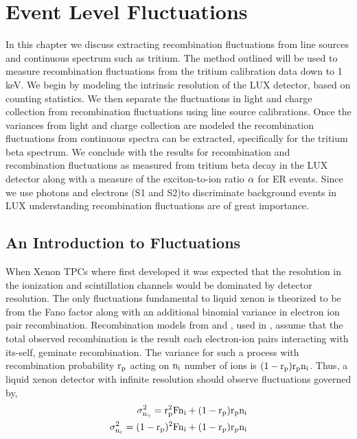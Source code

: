 \renewcommand{\thechapter}{5}

\chapter{Event Level Fluctuations}
\label{Ch:Flucs}

In this chapter we discuss extracting recombination fluctuations from line sources and continuous spectrum such as tritium. The method outlined will be used to measure recombination fluctuations from the tritium calibration data down to 1 keV. We begin by modeling the intrinsic resolution of the LUX detector, based on counting statistics. We then separate the fluctuations in light and charge collection from recombination fluctuations using line source calibrations. Once the variances from light and charge collection are modeled the recombination fluctuations from continuous spectra can be extracted, specifically for the tritium beta spectrum. We conclude with the results for recombination and recombination fluctuations as measured from tritium beta decay in the LUX detector along with a measure of the exciton-to-ion ratio $\rm \alpha$ for ER events. Since we use photons and electrons (S1 and S2)to discriminate background events in LUX understanding recombination fluctuations are of great importance.

\section{An Introduction to Fluctuations}

When Xenon TPCs where first developed it was expected that the resolution in the ionization and scintillation channels would be dominated by detector resolution. The only fluctuations fundamental to liquid xenon is theorized to be from the Fano factor along with an additional binomial variance in electron ion pair recombination. Recombination models from \cite{Thomas_Imel} and \cite{Birks}, used in \cite{NEST_2013}, assume that the total observed recombination is the result each electron-ion pairs interacting with its-self, geminate recombination. The variance for such a process with recombination probability $\rm r_p$ acting on $\rm n_i$ number of ions is $\rm (1-r_p)r_pn_i$. Thus, a liquid xenon detector with infinite resolution should observe fluctuations governed by, 
\begin{equation}
\begin{split}
\rm \sigma_{n_\gamma}^2=r_p^2Fn_i + (1-r_p)r_p n_i \\
\rm \sigma_{n_e}^2=(1-r_p)^2Fn_i + (1-r_p)r_p n_i
\label{eq:Fano_Intro}
\end{split}
\end{equation}

